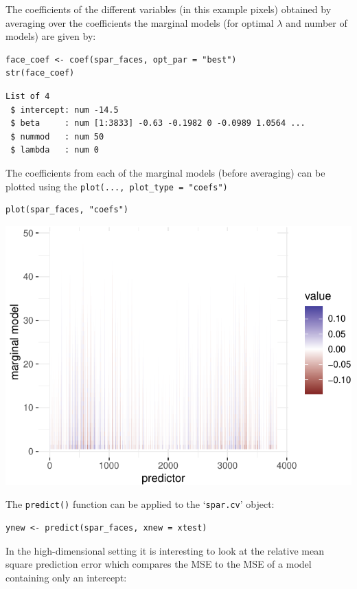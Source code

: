 \documentclass[
  article]{jss}
\begin{document}
The coefficients of the different variables (in this example pixels)
obtained by averaging over the coefficients the marginal models (for
optimal \(\lambda\) and number of models) are given by:

\begin{verbatim}
face_coef <- coef(spar_faces, opt_par = "best")
str(face_coef)
\end{verbatim}

\begin{verbatim}
List of 4
 $ intercept: num -14.5
 $ beta     : num [1:3833] -0.63 -0.1982 0 -0.0989 1.0564 ...
 $ nummod   : num 50
 $ lambda   : num 0
\end{verbatim}

The coefficients from each of the marginal models (before averaging) can
be plotted using the \texttt{plot(...,\ plot\_type\ =\ "coefs")}

\begin{verbatim}
plot(spar_faces, "coefs")
\end{verbatim}

\includegraphics{SPAR_files/figure-pdf/unnamed-chunk-9-1.pdf}

The \texttt{predict()} function can be applied to the `\texttt{spar.cv}'
object:

\begin{verbatim}
ynew <- predict(spar_faces, xnew = xtest)
\end{verbatim}

In the high-dimensional setting it is interesting to look at the
relative mean square prediction error which compares the MSE to the MSE
of a model containing only an intercept:
\end{document}
